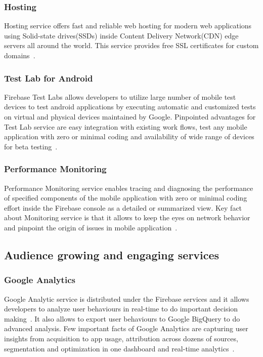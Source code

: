 \subsubsection{Hosting} Hosting service offers fast and reliable web hosting for
modern web applications using Solid-state drives(SSDs) inside Content Delivery
Network(CDN) edge servers all around the world. This service provides free SSL
certificates for custom domains~\cite{hid-sp18-409-www-firebase,
	hid-sp18-409-www-firebase-products}.

\subsubsection{Test Lab for Android } Firebase Test Labs allows developers to
utilize large number of mobile test devices to test android applications by
executing automatic and customized tests on virtual and physical devices
maintained by Google. Pinpointed advantages for Test Lab service are easy
integration with existing work flows, test any mobile application with zero or
minimal coding and availability of wide range of devices for beta
testing~\cite{hid-sp18-409-www-firebase-products}.

\subsubsection{Performance Monitoring} Performance Monitoring service enables
tracing and diagnosing the performance of specified components of the mobile
application with zero or minimal coding effort inside the Firebase console as a
detailed or summarized view. Key fact about Monitoring service is that it allows
to keep the eyes on network behavior and pinpoint the origin of issues in mobile
application~\cite{hid-sp18-409-www-firebase-products}.


\subsection{Audience growing and engaging services}

\subsubsection{Google Analytics} Google Analytic service is distributed under
the Firebase services and it allows developers to analyze user behaviours in
real-time to do important decision making~\cite{hid-sp18-409-www-firebase}. It
also allows to export user behaviours to Google BigQuery to do advanced
analysis. Few important facts of Google Analytics are capturing user insights
from acquisition to app usage, attribution across dozens of sources,
segmentation and optimization in one dashboard and real-time
analytics~\cite{hid-sp18-409-www-firebase-products}.

